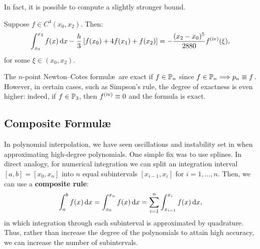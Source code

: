 In fact, it is possible to compute a slightly stronger bound.
\begin{theorem}
Suppose $f\in C^4(x_0,x_2)$. Then:
\[
\int_{x_0}^{x_2}f(x)\ud x - \dfrac{h}{3}\br[f(x_0)+4f(x_1)+f(x_2)] = -\dfrac{(x_2-x_0)^5}{2880}f^{({\rm iv})}(\xi),
\]
for some $\xi\in(x_0,x_2)$.
\end{theorem}

\begin{remark}
The $n$-point Newton--Cotes formul\ae~are exact if $f\in\P_n$ since $f\in\P_n\Longrightarrow p_n \equiv f$. However, in certain cases, such as Simpson's rule, the degree of exactness is even higher: indeed, if $f\in\P_3$, then $f^{({\rm iv})}\equiv0$ and the formula is exact.
\end{remark}

\subsection{Composite Formul\ae}

In polynomial interpolation, we have seen oscillations and instability set in when approximating high-degree polynomials. One simple fix was to use splines. In direct analogy, for numerical integration we can split an integration interval $[a,b] = [x_0,x_n]$ into $n$ equal subintervals $[x_{i-1},x_i]$ for $i=1,\ldots,n$. Then, we can use a {\bf composite rule}:
\[
\int_a^bf(x)\ud x = \int_{x_0}^{x_n}f(x)\ud x = \sum_{i=1}^n\int_{x_{i-1}}^{x_i}f(x)\ud x,
\]
in which integration through each subinterval is approximated by quadrature. Thus, rather than increase the degree of the polynomials to attain high accuracy, we can increase the number of subintervals.

